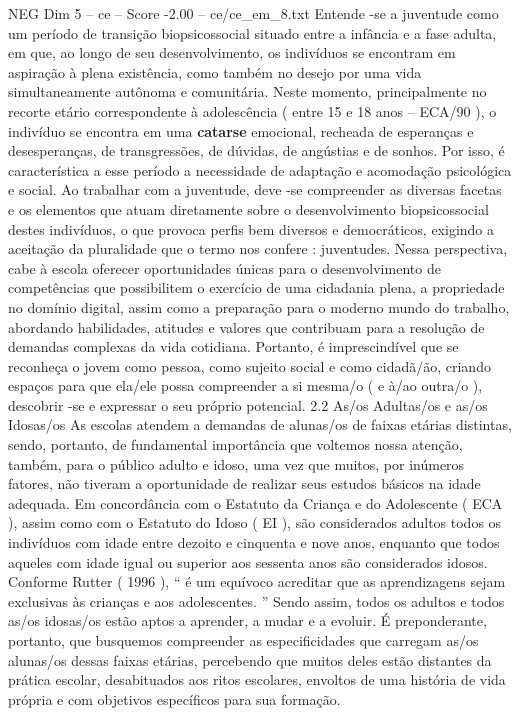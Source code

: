 \begin{textsample}{NEG Dim 5 – ce – Score -2.00 – ce/ce\_em\_8.txt}
Entende -se a juventude como um período de transição biopsicossocial situado entre a infância e a fase adulta, em que, ao longo de seu desenvolvimento, os indivíduos se encontram em aspiração à plena existência, como também no desejo por uma vida simultaneamente autônoma e comunitária.
Neste momento, principalmente no recorte etário correspondente à adolescência ( entre 15 e 18 anos – ECA/90 ), o indivíduo se encontra em uma \textbf{catarse} emocional, recheada de esperanças e desesperanças, de transgressões, de dúvidas, de angústias e de sonhos.
Por isso, é característica a esse período a necessidade de adaptação e acomodação psicológica e social.
Ao trabalhar com a juventude, deve -se compreender as diversas facetas e os elementos que atuam diretamente sobre o desenvolvimento biopsicossocial destes indivíduos, o que provoca perfis bem diversos e democráticos, exigindo a aceitação da pluralidade que o termo nos confere : juventudes.
Nessa perspectiva, cabe à escola oferecer oportunidades únicas para o desenvolvimento de competências que possibilitem o exercício de uma cidadania plena, a propriedade no domínio digital, assim como a preparação para o moderno mundo do trabalho, abordando habilidades, atitudes e valores que contribuam para a resolução de demandas complexas da vida cotidiana.
Portanto, é imprescindível que se reconheça o jovem como pessoa, como sujeito social e como cidadã/ão, criando espaços para que ela/ele possa compreender a si mesma/o ( e à/ao outra/o ), descobrir -se e expressar o seu próprio potencial. 2.2 As/os Adultas/os e as/os Idosas/os As escolas atendem a demandas de alunas/os de faixas etárias distintas, sendo, portanto, de fundamental importância que voltemos nossa atenção, também, para o público adulto e idoso, uma vez que muitos, por inúmeros fatores, não tiveram a oportunidade de realizar seus estudos básicos na idade adequada.
Em concordância com o Estatuto da Criança e do Adolescente ( ECA ), assim como com o Estatuto do Idoso ( EI ), são considerados adultos todos os indivíduos com idade entre dezoito e cinquenta e nove anos, enquanto que todos aqueles com idade igual ou superior aos sessenta anos são considerados idosos.
Conforme Rutter ( 1996 ), “ é um equívoco acreditar que as aprendizagens sejam exclusivas às crianças e aos adolescentes. ” Sendo assim, todos os adultos e todos as/os idosas/os estão aptos a aprender, a mudar e a evoluir.
É preponderante, portanto, que busquemos compreender as especificidades que carregam as/os alunas/os dessas faixas etárias, percebendo que muitos deles estão distantes da prática escolar, desabituados aos ritos escolares, envoltos de uma história de vida própria e com objetivos específicos para sua formação.

\end{textsample}
